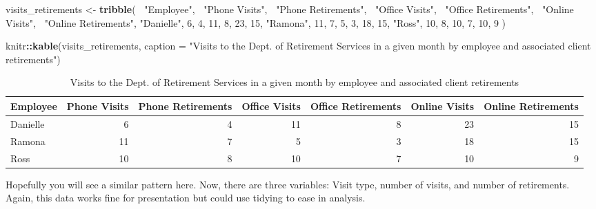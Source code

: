 \documentclass[]{book}
\newenvironment{Shaded}{\begin{snugshade}}{\end{snugshade}}
\newcommand{\DataTypeTok}[1]{\textcolor[rgb]{0.13,0.29,0.53}{#1}}
\newcommand{\DecValTok}[1]{\textcolor[rgb]{0.00,0.00,0.81}{#1}}
\newcommand{\KeywordTok}[1]{\textcolor[rgb]{0.13,0.29,0.53}{\textbf{#1}}}
\newcommand{\NormalTok}[1]{#1}
\newcommand{\OperatorTok}[1]{\textcolor[rgb]{0.81,0.36,0.00}{\textbf{#1}}}
\newcommand{\StringTok}[1]{\textcolor[rgb]{0.31,0.60,0.02}{#1}}
\begin{document}
\begin{Shaded}
\begin{Highlighting}[]
\NormalTok{visits_retirements <-}\StringTok{ }\KeywordTok{tribble}\NormalTok{(}
  \OperatorTok{~}\StringTok{"Employee"}\NormalTok{, }\OperatorTok{~}\StringTok{"Phone Visits"}\NormalTok{, }\OperatorTok{~}\StringTok{"Phone Retirements"}\NormalTok{, }\OperatorTok{~}\StringTok{"Office Visits"}\NormalTok{, }\OperatorTok{~}\StringTok{"Office Retirements"}\NormalTok{, }\OperatorTok{~}\StringTok{"Online Visits"}\NormalTok{, }\OperatorTok{~}\StringTok{"Online Retirements"}\NormalTok{,}
  \StringTok{"Danielle"}\NormalTok{, }\DecValTok{6}\NormalTok{, }\DecValTok{4}\NormalTok{, }\DecValTok{11}\NormalTok{, }\DecValTok{8}\NormalTok{, }\DecValTok{23}\NormalTok{, }\DecValTok{15}\NormalTok{,}
  \StringTok{"Ramona"}\NormalTok{, }\DecValTok{11}\NormalTok{, }\DecValTok{7}\NormalTok{, }\DecValTok{5}\NormalTok{, }\DecValTok{3}\NormalTok{, }\DecValTok{18}\NormalTok{, }\DecValTok{15}\NormalTok{,}
  \StringTok{"Ross"}\NormalTok{, }\DecValTok{10}\NormalTok{, }\DecValTok{8}\NormalTok{, }\DecValTok{10}\NormalTok{, }\DecValTok{7}\NormalTok{, }\DecValTok{10}\NormalTok{, }\DecValTok{9} 
\NormalTok{)}

\NormalTok{knitr}\OperatorTok{::}\KeywordTok{kable}\NormalTok{(visits_retirements, }\DataTypeTok{caption =} \StringTok{"Visits to the Dept. of Retirement Services in a given month by employee and associated client retirements"}\NormalTok{)}
\end{Highlighting}
\end{Shaded}

\begin{table}

\caption{\label{tab:unnamed-chunk-6}Visits to the Dept. of Retirement Services in a given month by employee and associated client retirements}
\centering
\begin{tabular}[t]{l|r|r|r|r|r|r}
\hline
Employee & Phone Visits & Phone Retirements & Office Visits & Office Retirements & Online Visits & Online Retirements\\
\hline
Danielle & 6 & 4 & 11 & 8 & 23 & 15\\
\hline
Ramona & 11 & 7 & 5 & 3 & 18 & 15\\
\hline
Ross & 10 & 8 & 10 & 7 & 10 & 9\\
\hline
\end{tabular}
\end{table}

Hopefully you will see a similar pattern here. Now, there are three variables: Visit type, number of visits, and number of retirements. Again, this data works fine for presentation but could use tidying to ease in analysis.
\end{document}
